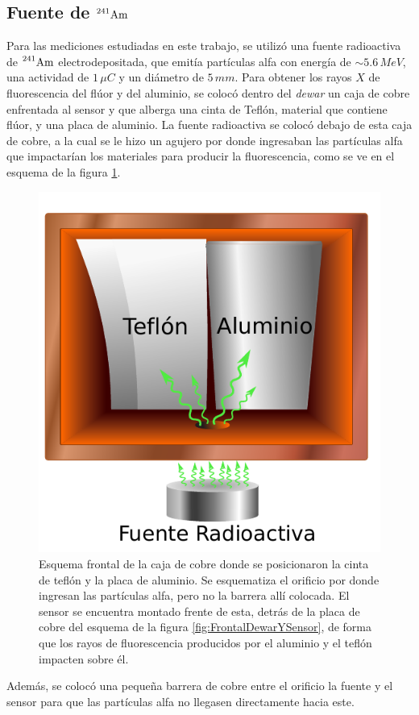 \subsection{Fuente de \texorpdfstring{$\prescript{241}{}{\mbox{Am}}$}{Am241}}
\noindent Para las mediciones estudiadas en este trabajo, se utilizó una fuente radioactiva de $\prescript{241}{}{\mbox{Am}}$ electrodepositada, que emitía partículas alfa con energía de $\sim 5.6\,\si{MeV}$, una actividad de $1\,\si{\mu C}$ y un diámetro de $5\,\si{mm}$. Para obtener los rayos $X$ de fluorescencia del flúor y del aluminio, se colocó dentro del \textit{dewar} un caja de cobre enfrentada al sensor y que alberga una cinta de Teflón, material que contiene flúor, y una placa de aluminio. La fuente radioactiva se colocó debajo de esta caja de cobre, a la cual se le hizo un agujero por donde ingresaban las partículas alfa que impactarían los materiales para producir la fluorescencia, como se ve en el esquema de la figura \ref{fig:FrontalAlYF}.
\begin{figure}[h]
    \centering
    \includegraphics[scale=0.7]{Figs/CajaSensor.pdf}
    \caption{\footnotesize{Esquema frontal de la caja de cobre donde se posicionaron la cinta de teflón y la placa de aluminio. Se esquematiza el orificio por donde ingresan las partículas alfa, pero no la barrera allí colocada. El sensor se encuentra montado frente de esta, detrás de la placa de cobre del esquema de la figura \ref{fig:FrontalDewarYSensor}, de forma que los rayos de fluorescencia producidos por el aluminio y el teflón impacten sobre él.}}
    \label{fig:FrontalAlYF}
\end{figure}
Además, se colocó una pequeña barrera de cobre entre el orificio la fuente y el sensor para que las partículas alfa no llegasen directamente hacia este.

